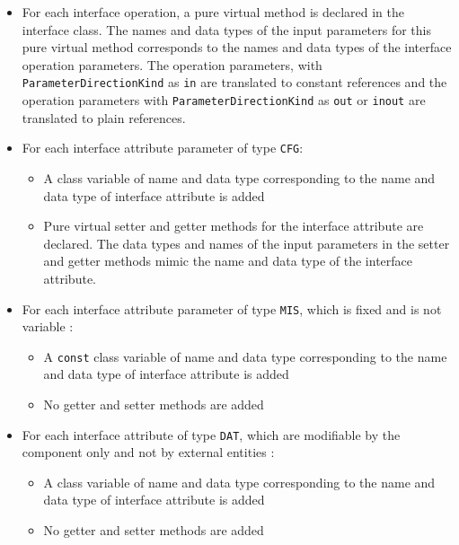 \begin{itemize}
\item For each interface operation, a pure virtual method is declared in the interface class. The names and data types of the input parameters for this pure virtual method corresponds to the names and data types of the interface operation parameters. The operation parameters, with \texttt{ParameterDirectionKind} as \texttt{in} are translated to constant references and the operation parameters with \texttt{ParameterDirectionKind} as \texttt{out} or \texttt{inout} are translated to plain references. 
\item For each interface attribute parameter of type \texttt{CFG}:
\begin{itemize}
\item A class variable of name and data type corresponding to the name and data type of interface attribute is added
\item Pure virtual setter and getter methods for the interface attribute are declared. The data types and names of the input parameters in the setter and getter methods mimic the name and data type of the interface attribute.
\end{itemize} 
\item For each interface attribute parameter of type \texttt{MIS}, which is fixed and is not variable \cite{SpecMetamodel}: 
\begin{itemize}
\item A \texttt{const} class variable of name and data type corresponding to the name and data type of interface attribute is added
\item No getter and setter methods are added
\end{itemize}
\item For each interface attribute of type \texttt{DAT}, which are modifiable by the component only and not by external entities \cite{SpecMetamodel}:
\begin{itemize}
\item A class variable of name and data type corresponding to the name and data type of interface attribute is added
\item No getter and setter methods are added  
\end{itemize}   
\end{itemize}

